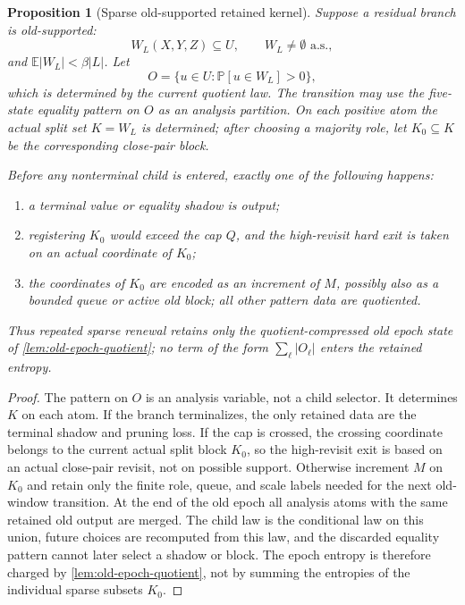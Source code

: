 \documentclass[11pt]{article}
\newcommand{\Cref}[1]{\ref{#1}}
\newtheorem{proposition}[theorem]{Proposition}
\theoremstyle{remark}
\newcommand{\E}{\mathbb E}
\newcommand{\Prob}{\mathbb P}
\begin{document}
\begin{proposition}[Sparse old-supported retained kernel]\label{prop:sparse-old}
Suppose a residual branch is old-supported:
\[
        W_L(X,Y,Z)\subseteq U,
        \qquad W_L\ne\emptyset \text{ a.s.},
\]
and $\E|W_L|<\beta |L|$.  Let
\[
        O=\{u\in U:\Prob[u\in W_L]>0\},
\]
which is determined by the current quotient law.  The transition may use the five-state equality pattern on $O$ as an analysis partition.  On each positive atom the actual split set $K=W_L$ is determined; after choosing a majority role, let $K_0\subseteq K$ be the corresponding close-pair block.

Before any nonterminal child is entered, exactly one of the following happens:
\begin{enumerate}[label=\textup{(\roman*)}]
\item a terminal value or equality shadow is output;
\item registering $K_0$ would exceed the cap $Q$, and the high-revisit hard exit is taken on an actual coordinate of $K_0$;
\item the coordinates of $K_0$ are encoded as an increment of $M$, possibly also as a bounded queue or active old block; all other pattern data are quotiented.
\end{enumerate}
Thus repeated sparse renewal retains only the quotient-compressed old epoch state of \Cref{lem:old-epoch-quotient}; no term of the form $\sum_\ell |O_\ell|$ enters the retained entropy.
\end{proposition}

\begin{proof}
The pattern on $O$ is an analysis variable, not a child selector.  It determines $K$ on each atom.  If the branch terminalizes, the only retained data are the terminal shadow and pruning loss.  If the cap is crossed, the crossing coordinate belongs to the current actual split block $K_0$, so the high-revisit exit is based on an actual close-pair revisit, not on possible support.  Otherwise increment $M$ on $K_0$ and retain only the finite role, queue, and scale labels needed for the next old-window transition.  At the end of the old epoch all analysis atoms with the same retained old output are merged.  The child law is the conditional law on this union, future choices are recomputed from this law, and the discarded equality pattern cannot later select a shadow or block.  The epoch entropy is therefore charged by \Cref{lem:old-epoch-quotient}, not by summing the entropies of the individual sparse subsets $K_0$.
\end{proof}
\end{document}
